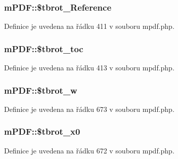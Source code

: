 \hypertarget{classm_p_d_f_ab1e3e40b1f862eb7cc6f3c2c1c1ccbd5}{
\subsubsection[{\$tbrot\-\_\-\-Reference}]{\setlength{\rightskip}{0pt plus 5cm}m\-P\-D\-F\-::\$tbrot\-\_\-\-Reference}}\label{classm_p_d_f_ab1e3e40b1f862eb7cc6f3c2c1c1ccbd5}


Definice je uvedena na řádku 411 v souboru mpdf.\-php.

\hypertarget{classm_p_d_f_a66608b12b203b0705ac3cb26552f2887}{
\subsubsection[{\$tbrot\-\_\-toc}]{\setlength{\rightskip}{0pt plus 5cm}m\-P\-D\-F\-::\$tbrot\-\_\-toc}}\label{classm_p_d_f_a66608b12b203b0705ac3cb26552f2887}


Definice je uvedena na řádku 413 v souboru mpdf.\-php.

\hypertarget{classm_p_d_f_ae53b8f01c33620a23566ec5d47afc31b}{
\subsubsection[{\$tbrot\-\_\-w}]{\setlength{\rightskip}{0pt plus 5cm}m\-P\-D\-F\-::\$tbrot\-\_\-w}}\label{classm_p_d_f_ae53b8f01c33620a23566ec5d47afc31b}


Definice je uvedena na řádku 673 v souboru mpdf.\-php.

\hypertarget{classm_p_d_f_a7c34b9d5d3561a2c82d2e4dc8928ea97}{
\subsubsection[{\$tbrot\-\_\-x0}]{\setlength{\rightskip}{0pt plus 5cm}m\-P\-D\-F\-::\$tbrot\-\_\-x0}}\label{classm_p_d_f_a7c34b9d5d3561a2c82d2e4dc8928ea97}


Definice je uvedena na řádku 672 v souboru mpdf.\-php.

